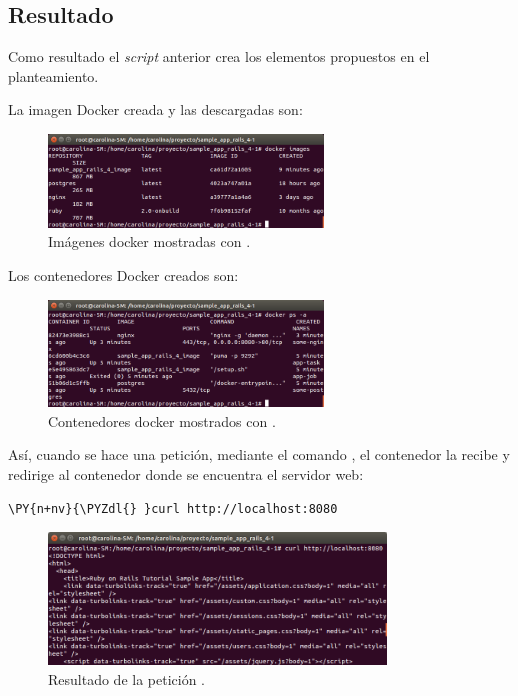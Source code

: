 \subsection{Resultado}

Como resultado el \textit{script} anterior crea los elementos propuestos en el planteamiento.

La imagen Docker creada y las descargadas son:

\begin{figure}[H]
\centering
\includegraphics[width=0.65\textwidth]{images/figures/dockerimages.png}
\caption{Imágenes docker mostradas con .}
\end{figure}

Los contenedores Docker creados son:

\begin{figure}[H]
\centering
\includegraphics[width=0.65\textwidth]{images/figures/dockerps.png}
\caption{Contenedores docker mostrados con .}
\end{figure}

Así, cuando se hace una petición, mediante el comando , el contenedor  la recibe y redirige al contenedor  donde se encuentra el servidor web:

\begin{framed_shaded}
\begin{Verbatim}[fontsize=\relsize{-2.5},fontseries=b,commandchars=\\\{\}]
\PY{n+nv}{\PYZdl{} }curl http://localhost:8080
\end{Verbatim}
\end{framed_shaded}

\begin{figure}[H]
\centering
\includegraphics[width=0.8\textwidth]{images/figures/curldocker.png}
\caption{Resultado de la petición .}
\end{figure}

